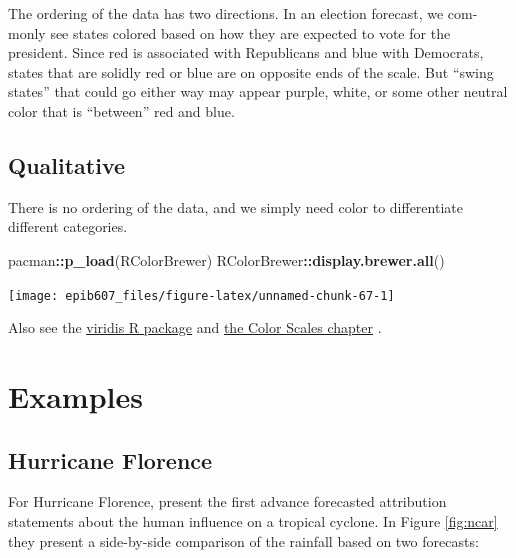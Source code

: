 \documentclass[]{book}
\makeatletter
\newenvironment{Shaded}{\begin{snugshade}}{\end{snugshade}}
\newcommand{\KeywordTok}[1]{\textcolor[rgb]{0.13,0.29,0.53}{\textbf{#1}}}
\newcommand{\OperatorTok}[1]{\textcolor[rgb]{0.81,0.36,0.00}{\textbf{#1}}}
\newcommand{\NormalTok}[1]{#1}
\newenvironment{kframe}{%
\medskip{}
\setlength{\fboxsep}{.8em}
 \def\at@end@of@kframe{}%
 \ifinner\ifhmode%
  \def\at@end@of@kframe{\end{minipage}}%
  \begin{minipage}{\columnwidth}%
 \fi\fi%
 \def\FrameCommand##1{\hskip\@totalleftmargin \hskip-\fboxsep
 \colorbox{shadecolor}{##1}\hskip-\fboxsep
     \hskip-\linewidth \hskip-\@totalleftmargin \hskip\columnwidth}%
 \MakeFramed {\advance\hsize-\width
   \@totalleftmargin\z@ \linewidth\hsize
   \@setminipage}}%
 {\par\unskip\endMakeFramed%
 \at@end@of@kframe}
\renewenvironment{Shaded}{\begin{kframe}}{\end{kframe}}
\theoremstyle{definition}
\theoremstyle{definition}
\theoremstyle{definition}
\theoremstyle{remark}
\makeatother
\begin{document}
The ordering of the data has two directions. In an election forecast, we
com- monly see states colored based on how they are expected to vote for
the president. Since red is associated with Republicans and blue with
Democrats, states that are solidly red or blue are on opposite ends of
the scale. But ``swing states'' that could go either way may appear
purple, white, or some other neutral color that is ``between'' red and
blue.

\subsection{Qualitative}\label{qualitative}

There is no ordering of the data, and we simply need color to
differentiate different categories.

\begin{Shaded}
\begin{Highlighting}[]
\NormalTok{pacman}\OperatorTok{::}\KeywordTok{p_load}\NormalTok{(RColorBrewer)}
\NormalTok{RColorBrewer}\OperatorTok{::}\KeywordTok{display.brewer.all}\NormalTok{()}
\end{Highlighting}
\end{Shaded}

\begin{center}\texttt{[image: epib607\_files/figure-latex/unnamed-chunk-67-1]} \end{center}

Also see the
\href{https://cran.r-project.org/web/packages/viridis/vignettes/intro-to-viridis.html}{viridis
R package} and
\href{https://serialmentor.com/dataviz/color-basics.html}{the Color
Scales chapter} \citep{wilke}.

\section{Examples}\label{examples}

\subsection{Hurricane Florence}\label{hurricane-florence}

For Hurricane Florence, \citet{ncar} present the first advance
forecasted attribution statements about the human influence on a
tropical cyclone. In Figure \ref{fig:ncar} they present a side-by-side
comparison of the rainfall based on two forecasts:
\end{document}
